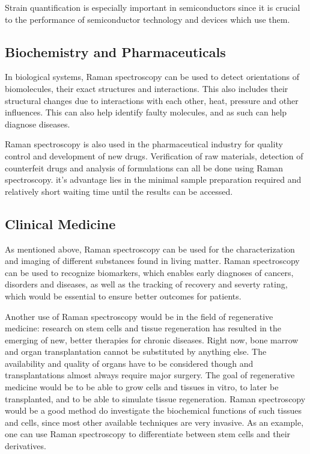 \bigskip

Strain quantification is especially important in semiconductors since it is crucial to the performance of semiconductor technology and devices which use them. 
\cite{semiconductors}

\subsection{Biochemistry and Pharmaceuticals}
 In biological systems, Raman spectroscopy can be used to detect orientations of biomolecules, their exact structures and interactions. This also includes their structural changes due to interactions with each other, heat, pressure and other influences. This can also help identify faulty molecules, and as such can help diagnose diseases.

 \bigskip

 Raman spectroscopy is also used in the pharmaceutical industry for quality control and development of new drugs. Verification of raw materials, detection of counterfeit drugs and analysis of formulations can all be done using Raman spectroscopy. it's advantage lies in the minimal sample preparation required and relatively short waiting time until the results can be accessed.\cite{pharma}

\subsection{Clinical Medicine}
As mentioned above, Raman spectroscopy can be used for the characterization and imaging of different substances found in living matter. Raman spectroscopy can be used to recognize biomarkers, which enables early diagnoses of cancers, disorders and diseases, as well as the tracking of recovery and severty rating, which would be essential to ensure better outcomes for patients. \cite{clinmed}

\bigskip

Another use of Raman spectroscopy would be in the field of regenerative medicine: research on stem cells and tissue regeneration has resulted in the emerging of new, better therapies for chronic diseases. Right now, bone marrow and organ transplantation cannot be substituted by anything else. The availability and quality of organs have to be considered though and transplantations almost always require major surgery. The goal of regenerative medicine would be to be able to grow cells and tissues in vitro, to later be transplanted, and to be able to simulate tissue regeneration. Raman spectroscopy would be a good method do investigate the biochemical functions of such tissues and cells, since most other available techniques are very invasive. As an example, one can use Raman spectroscopy to differentiate between stem cells and their derivatives. \cite{npj}


